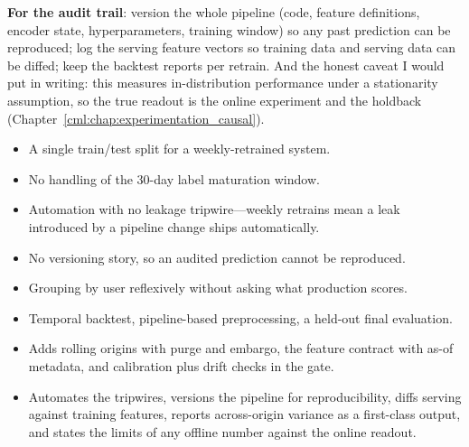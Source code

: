 \begin{interviewq}
\textbf{For the audit trail}: version the whole pipeline (code, feature definitions, encoder state, hyperparameters, training window) so any past prediction can be reproduced; log the serving feature vectors so training data and serving data can be diffed; keep the backtest reports per retrain. And the honest caveat I would put in writing: this measures in-distribution performance under a stationarity assumption, so the true readout is the online experiment and the holdback (Chapter~\ref{cml:chap:experimentation_causal}).

\redflags
\begin{itemize}
    \item A single train/test split for a weekly-retrained system.
    \item No handling of the 30-day label maturation window.
    \item Automation with no leakage tripwire---weekly retrains mean a leak introduced by a pipeline change ships automatically.
    \item No versioning story, so an audited prediction cannot be reproduced.
    \item Grouping by user reflexively without asking what production scores.
\end{itemize}


\goodgreat
\begin{itemize}
    \item {} Temporal backtest, pipeline-based preprocessing, a held-out final evaluation.
    \item {} Adds rolling origins with purge and embargo, the feature contract with as-of metadata, and calibration plus drift checks in the gate.
    \item {} Automates the tripwires, versions the pipeline for reproducibility, diffs serving against training features, reports across-origin variance as a first-class output, and states the limits of any offline number against the online readout.
\end{itemize}

\end{interviewq}
